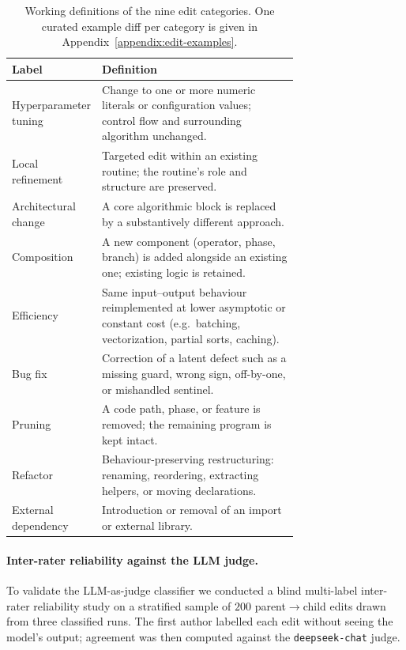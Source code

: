 \begin{table}[h]
\centering
\caption{Working definitions of the nine edit categories. One curated example diff per category is given in Appendix~\ref{appendix:edit-examples}.}
\label{tab:edit-type-definitions}
\small
\renewcommand{\arraystretch}{1.25}
\begin{tabular}{@{}lp{0.72\linewidth}@{}}
\toprule
\textbf{Label} & \textbf{Definition} \\
\midrule
Hyperparameter tuning & Change to one or more numeric literals or configuration values; control flow and surrounding algorithm unchanged. \\
Local refinement      & Targeted edit within an existing routine; the routine's role and structure are preserved. \\
Architectural change  & A core algorithmic block is replaced by a substantively different approach. \\
Composition           & A new component (operator, phase, branch) is added alongside an existing one; existing logic is retained. \\
Efficiency            & Same input--output behaviour reimplemented at lower asymptotic or constant cost (e.g.\ batching, vectorization, partial sorts, caching). \\
Bug fix               & Correction of a latent defect such as a missing guard, wrong sign, off-by-one, or mishandled sentinel. \\
Pruning               & A code path, phase, or feature is removed; the remaining program is kept intact. \\
Refactor              & Behaviour-preserving restructuring: renaming, reordering, extracting helpers, or moving declarations. \\
External dependency   & Introduction or removal of an import or external library. \\
\bottomrule
\end{tabular}
\end{table}

\paragraph{Inter-rater reliability against the LLM judge.}
To validate the LLM-as-judge classifier we conducted a blind multi-label inter-rater reliability study on a stratified sample of $200$ parent$\to$child edits drawn from three classified runs. The first author labelled each edit without seeing the model's output; agreement was then computed against the \texttt{deepseek-chat} judge.

